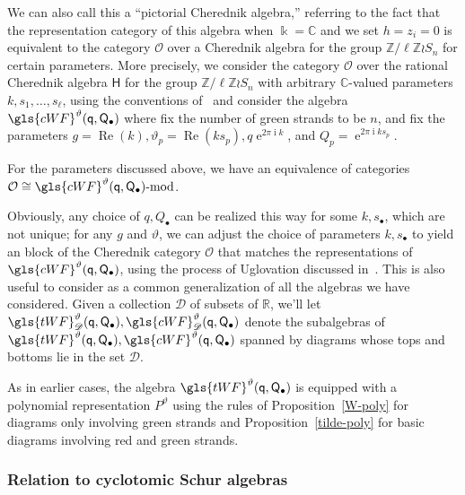 \documentclass[ALCO,ThmDefs,Unicode,epreuves]{cedram}
\DeclareMathOperator{\Rerm}{Re}
\DeclareMathOperator{\expe}{e}
\DeclareMathOperator{\ir}{i}
\newcommand{\pq}{\mathsf{q}}
\newcommand{\K}{\Bbbk}%
\newcommand{\Z}{\mathbb{Z}}
\newcommand{\R}{\mathbb{R}}
\newcommand{\Cbb}{\mathbb{C}}
\newcommand{\PQ}{\mathsf{Q}}
\newcommand{\cO}{\mathcal{O}}
\newcommand{\mmod}{\text{\upshape-mod}}
\begin{document}
We can also call this a ``pictorial
 Cherednik algebra,'' referring to the fact that the representation
 category of this algebra when $\K=\Cbb$ and we set $h=z_i=0$ is
 equivalent to the category
 $\cO$ over a Cherednik algebra for the group $\Z/\ell\Z\wr S_n$ for
 certain parameters. More precisely, we consider the category $\cO$ over the
 rational Cherednik algebra $\mathsf{H}$ for the group $\Z/\ell\Z\wr
 S_n$ with arbitrary $\Cbb$-valued parameters $k,
 s_1,\dots, s_\ell$, using the conventions of~\cite[\S~2.1]{WebRou}
 and consider the algebra
 $\gls{cWF}^\vartheta (\pq,\PQ_{\bullet})$ where fix the
 number of green strands to be $n$, and fix the parameters $g=\Rerm(k),
 \vartheta_p=\Rerm(ks_p), q\expe^{2\pi \ir k}$, and $Q_p=\expe^{2\pi \ir k s_p}$.
 \begin{theorem}
 For the parameters discussed above, we have an equivalence of
 categories $\cO\cong
 \gls{cWF}^\vartheta (\pq,\PQ_{\bullet})\mmod$. 
\end{theorem}
Obviously, any choice of $q,Q_\bullet$ can be realized this way for
some $k,s_\bullet$, which are not unique; for any $g$ and $\vartheta$,
we can adjust the choice of parameters $ k,s_\bullet$ to yield an
block of the Cherednik category $\cO$ that matches the representations
of $\gls{cWF}^\vartheta (\pq,\PQ_{\bullet})$, using the process
of Uglovation discussed in~\cite[Def.~2.8]{WebRou}.
 This is also useful to consider as a common generalization of all
 the algebras we have considered. 
Given a collection ${\mathscr{D}}$ of subsets of $\R$, we'll let $\gls{tWF}^\vartheta_{\mathscr{D}}
(\pq,\PQ_{\bullet}),\gls{cWF}_{\mathscr{D}}^\vartheta (\pq,\PQ_{\bullet})$
denote the subalgebras of $\gls{tWF}^\vartheta
(\pq,\PQ_{\bullet}), \gls{cWF}^\vartheta (\pq,\PQ_{\bullet})$ spanned by
diagrams whose tops and bottoms lie in the set ${\mathscr{D}}$. 

As in earlier cases, the algebra $\gls{tWF}^\vartheta (\pq,\PQ_{\bullet})$
 is equipped with a polynomial representation $P^\vartheta$ using the rules of
 Proposition~\ref{W-poly} for diagrams only involving green strands and
 Proposition~\ref{tilde-poly} for basic diagrams involving red and
 green strands.

 \subsubsection{Relation to cyclotomic Schur algebras}
\label{sec:relation-hecke-schur}
\end{document}
